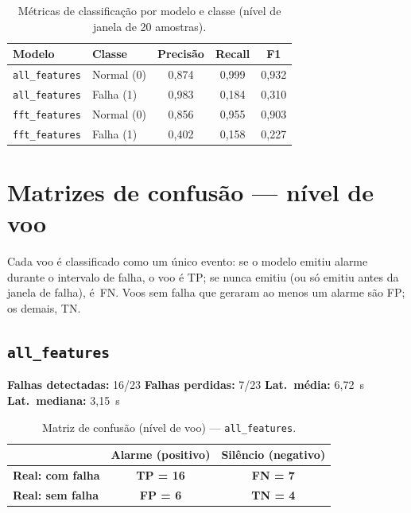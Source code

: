 \documentclass[12pt, a4paper]{article}
\newcommand{\cmTP}[1]{\cellcolor{verdebg}\color{verdedark}\textbf{TP = #1}}
\newcommand{\cmTN}[1]{\cellcolor{verdebg}\color{verdedark}\textbf{TN = #1}}
\newcommand{\cmFP}[1]{\cellcolor{vermbg}\color{vermdark}\textbf{FP = #1}}
\newcommand{\cmFN}[1]{\cellcolor{vermbg}\color{vermdark}\textbf{FN = #1}}
\begin{document}
\begin{table}[H]
  \centering
  \caption{Métricas de classificação por modelo e classe (nível de janela de 20 amostras).}
  \label{tab:metricas}
  \begin{tabular}{llccc}
    \toprule
    \textbf{Modelo} & \textbf{Classe} & \textbf{Precisão} & \textbf{Recall} & \textbf{F1} \\
    \midrule
    \rowcolor{azulhd}
    \texttt{all\_features} & Normal (0) & 0{,}874 & 0{,}999 & 0{,}932 \\
    \rowcolor{azulhd}
    \texttt{all\_features} & Falha  (1) & 0{,}983 & 0{,}184 & 0{,}310 \\
    \rowcolor{azulhd2}
    \texttt{fft\_features} & Normal (0) & 0{,}856 & 0{,}955 & 0{,}903 \\
    \rowcolor{azulhd2}
    \texttt{fft\_features} & Falha  (1) & 0{,}402 & 0{,}158 & 0{,}227 \\
    \bottomrule
  \end{tabular}
\end{table}

\section{Matrizes de confusão --- nível de voo}

Cada voo é classificado como um único evento: se o modelo emitiu alarme durante
o intervalo de falha, o voo é TP; se nunca emitiu (ou só emitiu antes da janela
de falha), é~FN. Voos sem falha que geraram ao menos um alarme são FP; os
demais, TN.

\subsection{\texttt{all\_features}}

\noindent
\textbf{Falhas detectadas:} 16/23 \quad
\textbf{Falhas perdidas:} 7/23 \quad
\textbf{Lat.\ média:} 6{,}72~s \quad
\textbf{Lat.\ mediana:} 3{,}15~s

\vspace{6pt}

\begin{table}[H]
  \centering
  \caption{Matriz de confusão (nível de voo) --- \texttt{all\_features}.}
  \label{tab:cm_all}
  \begin{tabular}{lcc}
    \toprule
    & \textbf{Alarme (positivo)} & \textbf{Silêncio (negativo)} \\
    \midrule
    \textbf{Real: com falha} & \cmTP{16} & \cmFN{7} \\
    \textbf{Real: sem falha} & \cmFP{6}  & \cmTN{4} \\
    \bottomrule
  \end{tabular}
\end{table}
\end{document}
